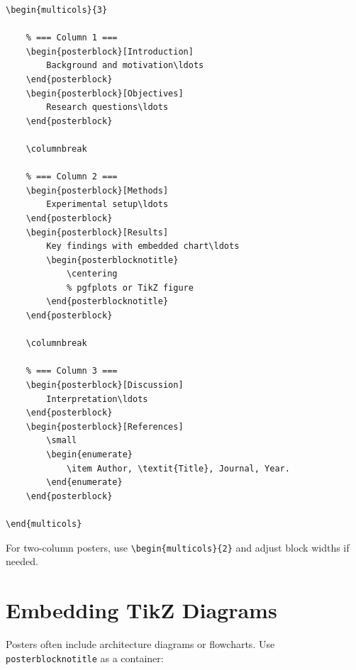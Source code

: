 \begin{verbatim}
\begin{multicols}{3}

    % === Column 1 ===
    \begin{posterblock}[Introduction]
        Background and motivation\ldots
    \end{posterblock}
    \begin{posterblock}[Objectives]
        Research questions\ldots
    \end{posterblock}

    \columnbreak

    % === Column 2 ===
    \begin{posterblock}[Methods]
        Experimental setup\ldots
    \end{posterblock}
    \begin{posterblock}[Results]
        Key findings with embedded chart\ldots
        \begin{posterblocknotitle}
            \centering
            % pgfplots or TikZ figure
        \end{posterblocknotitle}
    \end{posterblock}

    \columnbreak

    % === Column 3 ===
    \begin{posterblock}[Discussion]
        Interpretation\ldots
    \end{posterblock}
    \begin{posterblock}[References]
        \small
        \begin{enumerate}
            \item Author, \textit{Title}, Journal, Year.
        \end{enumerate}
    \end{posterblock}

\end{multicols}
\end{verbatim}

For two-column posters, use \texttt{\textbackslash begin\{multicols\}\{2\}}
and adjust block widths if needed.

\section{Embedding TikZ Diagrams}

Posters often include architecture diagrams or flowcharts.  Use
\texttt{posterblocknotitle} as a container:

